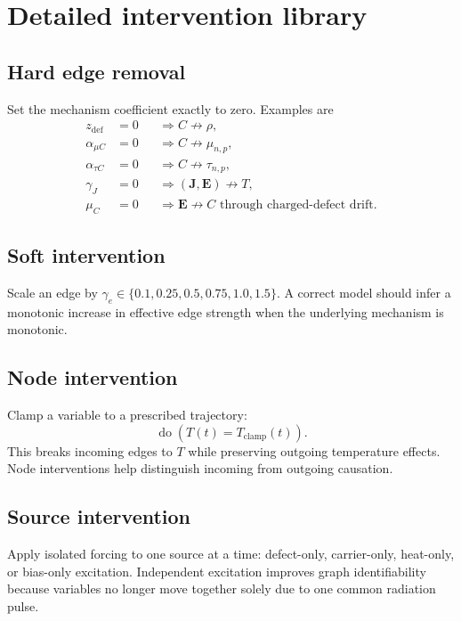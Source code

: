 \documentclass[11pt]{article}
\newcommand{\Evec}{\bm{E}}
\newcommand{\Jvec}{\bm{J}}
\begin{document}
\section{Detailed intervention library}

\subsection{Hard edge removal}

Set the mechanism coefficient exactly to zero. Examples are
\begin{align}
z_{\mathrm{def}}&=0 &&\Rightarrow C\not\rightarrow\rho,\\
\alpha_{\mu C}&=0 &&\Rightarrow C\not\rightarrow\mu_{n,p},\\
\alpha_{\tau C}&=0 &&\Rightarrow C\not\rightarrow\tau_{n,p},\\
\gamma_J&=0 &&\Rightarrow (\Jvec,\Evec)\not\rightarrow T,\\
\mu_C&=0 &&\Rightarrow \Evec\not\rightarrow C \text{ through charged-defect drift}.
\end{align}

\subsection{Soft intervention}

Scale an edge by \(\gamma_e\in\{0.1,0.25,0.5,0.75,1.0,1.5\}\). A correct model should infer a monotonic increase in effective edge strength when the underlying mechanism is monotonic.

\subsection{Node intervention}

Clamp a variable to a prescribed trajectory:
\begin{equation}
\operatorname{do}\left(T(t)=T_{\mathrm{clamp}}(t)\right).
\end{equation}
This breaks incoming edges to \(T\) while preserving outgoing temperature effects. Node interventions help distinguish incoming from outgoing causation.

\subsection{Source intervention}

Apply isolated forcing to one source at a time: defect-only, carrier-only, heat-only, or bias-only excitation. Independent excitation improves graph identifiability because variables no longer move together solely due to one common radiation pulse.
\end{document}
